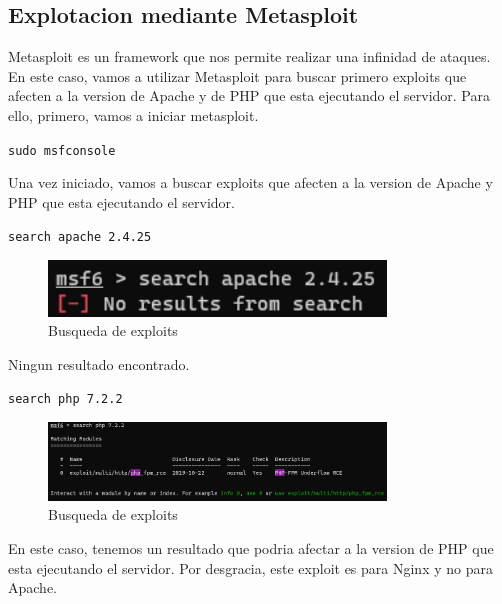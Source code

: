 \documentclass{report}
\begin{document}
            \subsection{Explotacion mediante Metasploit}
                Metasploit es un framework que nos permite realizar una infinidad de ataques.
                En este caso, vamos a utilizar Metasploit para buscar primero exploits que afecten a la version de Apache y de PHP que esta ejecutando el servidor.
                Para ello, primero, vamos a iniciar metasploit.
                \begin{center}
                    \texttt{sudo msfconsole}
                \end{center}
                Una vez iniciado, vamos a buscar exploits que afecten a la version de Apache y PHP que esta ejecutando el servidor.
                \begin{center}
                    \texttt{search apache 2.4.25}
                \end{center}
                \begin{figure}[H]
                    \centering
                    \includegraphics[width=0.8\textwidth]{./img/vulnerabilidades/2.5/1.1.png}
                    \caption{Busqueda de exploits}
                \end{figure}
                Ningun resultado encontrado.\\
                \begin{center}
                    \texttt{search php 7.2.2}
                \end{center}
                \begin{figure}[H]
                    \centering
                    \includegraphics[width=0.8\textwidth]{./img/vulnerabilidades/2.5/1.2.png}
                    \caption{Busqueda de exploits}
                \end{figure}
                En este caso, tenemos un resultado que podria afectar a la version de PHP que esta ejecutando el servidor. Por desgracia, este exploit es para Nginx y no para Apache.\\
\end{document}
